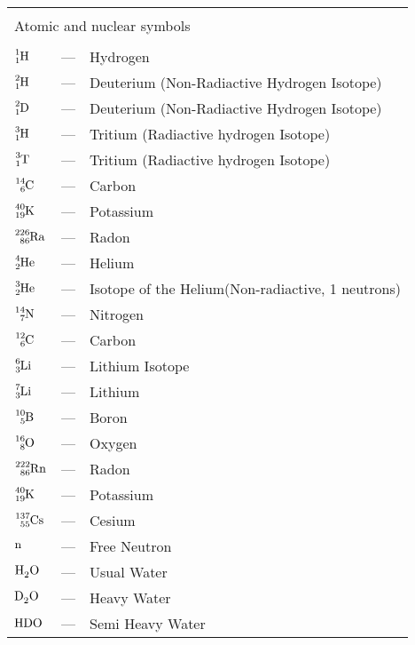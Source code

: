 \begin{longtable}{p{25mm} c p{120mm} }
\\
\\
\multicolumn{3}{l}{Atomic and nuclear symbols}\\
\\
$\ce{^{1}_{1}H}$ & --- & Hydrogen\\
$\ce{^{2}_{1}H}$ & --- & Deuterium (Non-Radiactive Hydrogen Isotope)\\
$\ce{^{2}_{1}D}$ & --- & Deuterium (Non-Radiactive Hydrogen Isotope)\\
$\ce{^{3}_{1}H}$ & --- & Tritium (Radiactive hydrogen Isotope)\\
$\ce{^{3}_{1}T}$ & --- & Tritium (Radiactive hydrogen Isotope)\\
$\ce{^{14}_{6}C}$ & --- & Carbon\\
$\ce{^{40}_{19}K}$ & --- & Potassium\\
$\ce{^{226}_{86}Ra}$ & --- & Radon\\

$\ce{^{4}_{2}He}$ & --- & Helium\\
$\ce{^{3}_{2}He}$ & --- & Isotope of the Helium(Non-radiactive, 1 neutrons)\\
$\ce{^{14}_{7}N}$ & --- & Nitrogen\\
$\ce{^{12}_{6}C}$ & --- & Carbon\\
$\ce{^{6}_{3}Li}$ & --- & Lithium Isotope\\
$\ce{^{7}_{3}Li}$ & --- & Lithium\\
$\ce{^{10}_{5}B}$ & --- & Boron\\
$\ce{^{16}_{8}O}$ & --- & Oxygen\\
$\ce{^{222}_{86}Rn}$ & --- & Radon\\
$\ce{^{40}_{19}K}$ & --- & Potassium\\
$\ce{^{137}_{55}Cs}$ & --- & Cesium\\
$\ce{n}$ & --- & Free Neutron\\
$\ce{H_{2}O}$ & --- & Usual Water\\
$\ce{D_{2}O}$ & --- & Heavy Water\\
$\ce{HDO}$ & --- & Semi Heavy Water\\


\end{longtable}
